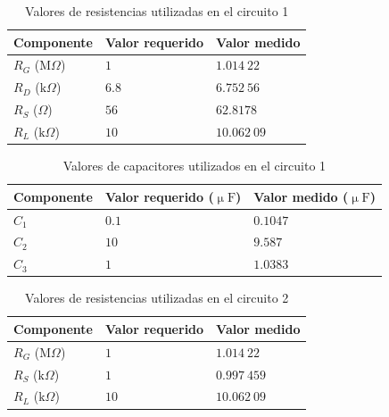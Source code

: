 \documentclass[journal]{IEEEtran}
\begin{document}
\begin{table}[H]
        \centering
        \renewcommand{\arraystretch}{1.5}
        \caption{Valores de resistencias utilizadas en el circuito 1}
        \begin{tabular}{ >{\centering\arraybackslash}m{2.5cm} >{\centering\arraybackslash}m{2.5cm} >{\centering\arraybackslash}m{2.5cm} }
                \hline
            \centering
            Componente & Valor requerido & Valor medido\\ 
            \hline
            \centering
            $R_G$ ($\mathrm{M}\Omega$) & $1$  & $1.014~22$  \\ 
            $R_D$ ($\mathrm{k}\Omega$) & $6.8$  & $6.752~56$  \\
            $R_S$ ($\Omega$) & $56$  & $62.8178$  \\
            $R_L$ ($\mathrm{k}\Omega$) & $10$  & $10.062~09$ \\
            \hline
        \end{tabular}
        \label{tabla1}
    \end{table}
    
\begin{table}[H]
        \centering
        \renewcommand{\arraystretch}{1.5}
        \caption{Valores de capacitores utilizados en el circuito 1}
        \begin{tabular}{ >{\centering\arraybackslash}m{2.5cm} >{\centering\arraybackslash}m{2.5cm} >{\centering\arraybackslash}m{2.5cm} }
                \hline
            Componente & Valor requerido ($\upmu\mathrm{F}$) & Valor medido ($\upmu\mathrm{F}$)\\ 
            \hline
            \centering
            $C_1$ & $0.1$  & $0.1047$  \\ 
            $C_2$ & $10$  & $9.587$ \\
            $C_3$ & $1$  & $1.0383$ \\
            \hline
        \end{tabular}
        \label{tabla2}
    \end{table}    

\begin{table}[H]
        \centering
        \renewcommand{\arraystretch}{1.5}
        \caption{Valores de resistencias utilizadas en el circuito 2}
        \begin{tabular}{ >{\centering\arraybackslash}m{2.5cm} >{\centering\arraybackslash}m{2.5cm} >{\centering\arraybackslash}m{2.5cm} }
                \hline
            Componente & Valor requerido & Valor medido\\ 
            \hline
            \centering
            $R_G$ ($\mathrm{M}\Omega$)& $1$  & $1.014~22$  \\ 
            $R_S$ ($\mathrm{k}\Omega$) & $1$  & $0.997~459$  \\
            $R_L$ ($\mathrm{k}\Omega$) & $10$  & $10.062~09$  \\
            \hline
        \end{tabular}
        \label{tabla3}
    \end{table}
\end{document}
